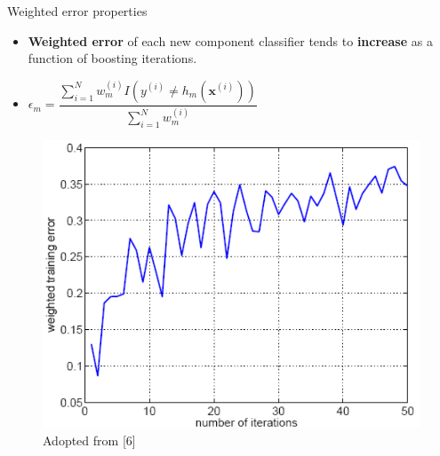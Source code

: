 \documentclass[serif, aspectratio=169]{beamer}
\begin{document}
\begin{frame}{Weighted error properties}
    \begin{itemize}
        \itemsep1em
        \justifying
        \item \textbf{Weighted error} of each new component classifier tends to \textbf{increase} as a function of boosting iterations.
        \item[] \begin{center}
            $\epsilon_m = \dfrac{\sum_{i=1}^N w_m^{(i)}I\left(y^{(i)} \neq h_m(\boldsymbol{x}^{(i)})\right)}{\sum_{i=1}^N w_m^{(i)}}$
        \end{center}
    \end{itemize}
    \vfill
    \begin{center}
        \begin{figure}
            \includegraphics[width=\textwidth]{pic/boosting_weights.png}
            {\scriptsize Adopted from [6]}
        \end{figure}
        \endminipage
    \end{center}
\end{frame}
\end{document}
